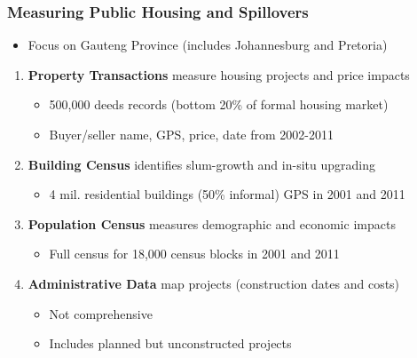 \documentclass[aspectratio=149]{beamer}
\begin{document}



\begin{frame}
\frametitle{Measuring Public Housing and Spillovers}

\begin{itemize}
  \item Focus on Gauteng Province (includes Johannesburg and Pretoria)
\end{itemize}

\begin{enumerate}
\item \textbf{Property Transactions} measure housing projects and price impacts
  \begin{itemize}
    \item 500,000 deeds records (bottom 20\% of formal housing market)
    \item Buyer/seller name, GPS, price, date from 2002-2011
  \end{itemize}
\vspace{.2cm}
\item \textbf{Building Census} identifies slum-growth and in-situ upgrading
  \begin{itemize}
    \item 4 mil. residential buildings (50\% informal) GPS in 2001 and 2011
  \end{itemize}
\vspace{.2cm}
\item \textbf{Population Census} measures demographic and economic impacts
  \begin{itemize}
    \item Full census for 18,000 census blocks in 2001 and 2011
  \end{itemize}
\vspace{.2cm}
\item \textbf{Administrative Data} map projects (construction dates and costs)
  \begin{itemize}
    \item Not comprehensive
    \item Includes planned but unconstructed projects
  \end{itemize}


\end{enumerate}

\end{frame}

\end{document}

